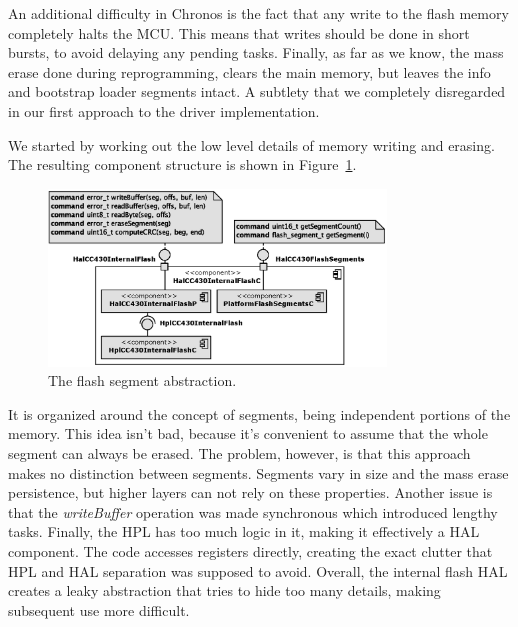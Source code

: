An additional difficulty in Chronos is the fact that any write to the flash memory completely halts the MCU. This means that writes should be done in short bursts, to avoid delaying any pending tasks. Finally, as far as we know, the mass erase done during reprogramming, clears the main memory, but leaves the info and bootstrap loader segments intact. A subtlety that we completely disregarded in our first approach to the driver implementation.

We started by working out the low level details of memory writing and erasing. The resulting component structure is shown in Figure~\ref{fig:hal_cc430_internal_flash_c}.
\begin{figure}[h]
  \centering
  \includegraphics[width=0.8\textwidth]{diagrams/hal_cc430_internal_flash_c.eps}
  \caption{The flash segment abstraction.}
  \label{fig:hal_cc430_internal_flash_c}
\end{figure}
It is organized around the concept of segments, being independent portions of the memory. This idea isn't bad, because it's convenient to assume that the whole segment can always be erased. The problem, however, is that this approach makes no distinction between segments. Segments vary in size and the mass erase persistence, but higher layers can not rely on these properties. Another issue is that the \emph{writeBuffer} operation was made synchronous which introduced lengthy tasks. Finally, the HPL has too much logic in it, making it effectively a HAL component. The code accesses registers directly, creating the exact clutter that HPL and HAL separation was supposed to avoid. Overall, the internal flash HAL creates a leaky abstraction that tries to hide too many details, making subsequent use more difficult.

